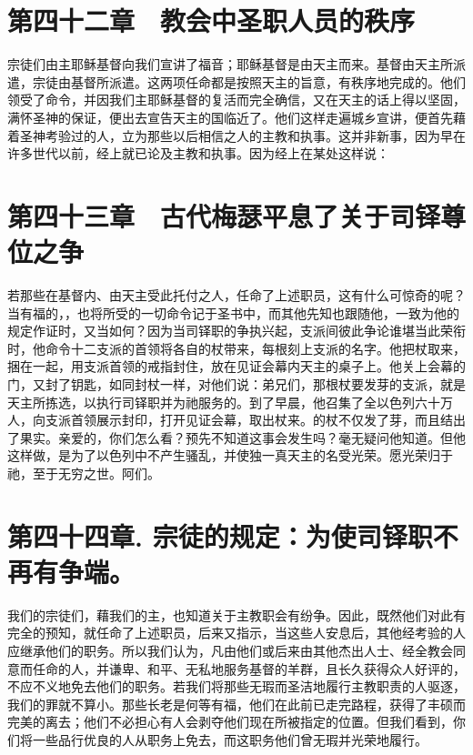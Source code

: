 
\section{第四十二章　教会中圣职人员的秩序}

宗徒们由主耶稣基督向我们宣讲了福音；耶稣基督是由天主而来。基督由天主所派遣，宗徒由基督所派遣。这两项任命都是按照天主的旨意，有秩序地完成的。他们领受了命令，并因我们主耶稣基督的复活而完全确信，又在天主的话上得以坚固，满怀圣神的保证，便出去宣告天主的国临近了。他们这样走遍城乡宣讲，便首先藉着圣神考验过的人，立为那些以后相信之人的主教和执事。这并非新事，因为早在许多世代以前，经上就已论及主教和执事。因为经上在某处这样说：\par


\section{第四十三章　古代梅瑟平息了关于司铎尊位之争}

若那些在基督内、由天主受此托付之人，任命了上述职员，这有什么可惊奇的呢？当有福的，，也将所受的一切命令记于圣书中，而其他先知也跟随他，一致为他的规定作证时，又当如何？因为当司铎职的争执兴起，支派间彼此争论谁堪当此荣衔时，他命令十二支派的首领将各自的杖带来，每根刻上支派的名字。他把杖取来，捆在一起，用支派首领的戒指封住，放在见证会幕内天主的桌子上。他关上会幕的门，又封了钥匙，如同封杖一样，对他们说：弟兄们，那根杖要发芽的支派，就是天主所拣选，以执行司铎职并为祂服务的。到了早晨，他召集了全以色列六十万人，向支派首领展示封印，打开见证会幕，取出杖来。的杖不仅发了芽，而且结出了果实。亲爱的，你们怎么看？预先不知道这事会发生吗？毫无疑问他知道。但他这样做，是为了以色列中不产生骚乱，并使独一真天主的名受光荣。愿光荣归于祂，至于无穷之世。阿们。\par


\section{第四十四章. 宗徒的规定：为使司铎职不再有争端。}

我们的宗徒们，藉我们的主，也知道关于主教职会有纷争。因此，既然他们对此有完全的预知，就任命了上述职员，后来又指示，当这些人安息后，其他经考验的人应继承他们的职务。所以我们认为，凡由他们或后来由其他杰出人士、经全教会同意而任命的人，并谦卑、和平、无私地服务基督的羊群，且长久获得众人好评的，不应不义地免去他们的职务。若我们将那些无瑕而圣洁地履行主教职责的人驱逐，我们的罪就不算小。那些长老是何等有福，他们在此前已走完路程，获得了丰硕而完美的离去；他们不必担心有人会剥夺他们现在所被指定的位置。但我们看到，你们将一些品行优良的人从职务上免去，而这职务他们曾无瑕并光荣地履行。\par

